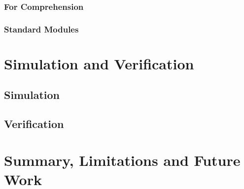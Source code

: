 \subsubsection{For Comprehension}
\subsubsection{Standard Modules}
\section{Simulation and Verification}
\subsection{Simulation}
\subsection{Verification}
\section{Summary, Limitations and Future Work}
